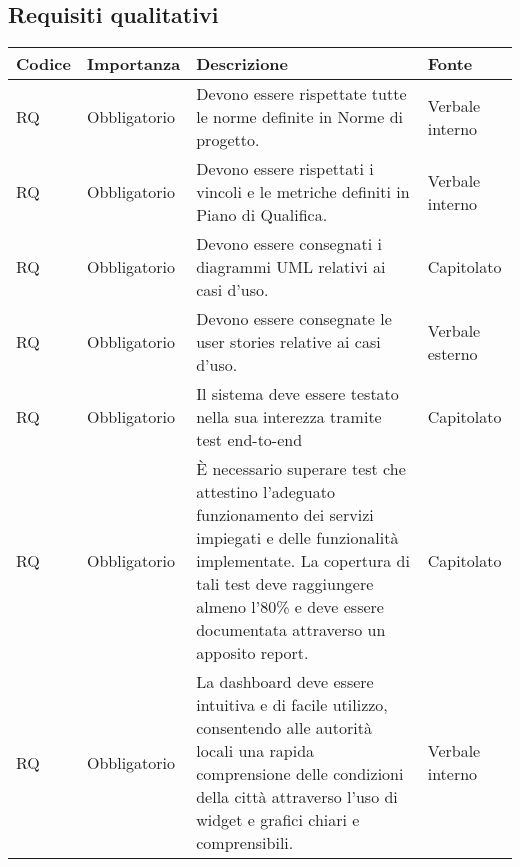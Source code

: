 \subsection{Requisiti qualitativi}
\setcounter{rowcounter}{0}
\begin{longtable}{|C{1cm}|C{2cm}|>{\raggedright}m{5cm}|C{2cm}|}
    \hline
    \textbf{Codice}                                & \textbf{Importanza} & \textbf{Descrizione}    & \textbf{Fonte}  \\
    \hline
    RQ                          & Obbligatorio        &  Devono essere rispettate tutte le norme definite in Norme di progetto.  & Verbale interno                        \\
    \hline
     RQ & Obbligatorio        &  Devono essere rispettati i vincoli e le metriche definiti in Piano di Qualifica.  & Verbale interno                          \\
    \hline
     RQ & Obbligatorio        &  Devono essere consegnati i diagrammi UML relativi ai casi d'uso.  & Capitolato                          \\
    \hline
     RQ & Obbligatorio        &  Devono essere consegnate le user stories relative ai casi d'uso.  & Verbale esterno                          \\
    \hline
     RQ & Obbligatorio        &  Il sistema deve essere testato nella sua interezza tramite test end-to-end  & Capitolato                          \\
    \hline
     RQ & Obbligatorio        &  È necessario superare test che attestino l'adeguato funzionamento dei servizi impiegati e delle funzionalità implementate. La copertura di tali test deve raggiungere almeno l'80\% e deve essere documentata attraverso un apposito report. & Capitolato                          \\
    \hline
     RQ & Obbligatorio        &  La dashboard deve essere intuitiva e di facile utilizzo, consentendo alle autorità locali una rapida comprensione delle condizioni della città attraverso l'uso di widget e grafici chiari e comprensibili.  & Verbale interno                          \\
    \hline
   
\end{longtable}